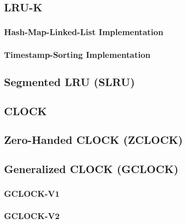     

\subsection{LRU-K} \label{subsec:lru-k}

    

\subsubsection[Hash-Map-Linked-List]{Hash-Map-Linked-List Implementation} \label{subsubsec:lru-k_traditional}

    

\subsubsection[Timestamp-Sorting]{Timestamp-Sorting Implementation} \label{subsubsec:lru-k_timestamp}

    

\subsection[SLRU]{Segmented LRU (SLRU)} \label{subsec:slru}

    

\subsection{CLOCK} \label{subsec:clock}

    

\subsection[ZCLOCK]{Zero-Handed CLOCK (ZCLOCK)} \label{subsec:zclock}

    

\subsection[GCLOCK]{Generalized CLOCK (GCLOCK)} \label{subsec:gclock}

    

\subsubsection{GCLOCK-V1} \label{subsubsec:gclock-v1}

    

\subsubsection{GCLOCK-V2} \label{subsubsec:gclock-v2}

